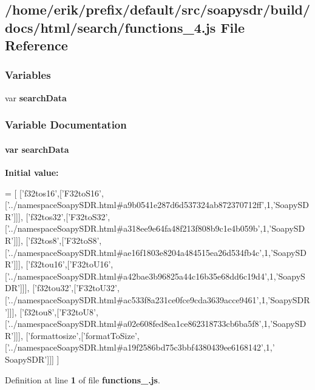 \subsection{/home/erik/prefix/default/src/soapysdr/build/docs/html/search/functions\+\_\+4.js File Reference}
\label{functions__4_8js}
\subsubsection*{Variables}
\begin{DoxyCompactItemize}
\item 
var {\bf search\+Data}
\end{DoxyCompactItemize}


\subsubsection{Variable Documentation}
\paragraph[{search\+Data}]{\setlength{\rightskip}{0pt plus 5cm}var search\+Data}\label{functions__4_8js_ad01a7523f103d6242ef9b0451861231e}
{\bfseries Initial value\+:}
\begin{DoxyCode}
=
[
  [\textcolor{stringliteral}{'f32tos16'},[\textcolor{stringliteral}{'F32toS16'},[\textcolor{stringliteral}{'../namespaceSoapySDR.html#a9b0541e287d6d537324ab872370712ff'},1,\textcolor{stringliteral}{'SoapySDR'}]]],
  [\textcolor{stringliteral}{'f32tos32'},[\textcolor{stringliteral}{'F32toS32'},[\textcolor{stringliteral}{'../namespaceSoapySDR.html#a318ee9e64fa48f213f808b9c1e4b059b'},1,\textcolor{stringliteral}{'SoapySDR'}]]],
  [\textcolor{stringliteral}{'f32tos8'},[\textcolor{stringliteral}{'F32toS8'},[\textcolor{stringliteral}{'../namespaceSoapySDR.html#ae16f1803e8204a484515ea26d534fb4c'},1,\textcolor{stringliteral}{'SoapySDR'}]]],
  [\textcolor{stringliteral}{'f32tou16'},[\textcolor{stringliteral}{'F32toU16'},[\textcolor{stringliteral}{'../namespaceSoapySDR.html#a42bae3b96825a44c16b35e68dd6c19d4'},1,\textcolor{stringliteral}{'SoapySDR'}]]],
  [\textcolor{stringliteral}{'f32tou32'},[\textcolor{stringliteral}{'F32toU32'},[\textcolor{stringliteral}{'../namespaceSoapySDR.html#ac533f8a231ce0fce9cda3639acce9461'},1,\textcolor{stringliteral}{'SoapySDR'}]]],
  [\textcolor{stringliteral}{'f32tou8'},[\textcolor{stringliteral}{'F32toU8'},[\textcolor{stringliteral}{'../namespaceSoapySDR.html#a02e608fed8ea1ce862318733cb6ba5f8'},1,\textcolor{stringliteral}{'SoapySDR'}]]],
  [\textcolor{stringliteral}{'formattosize'},[\textcolor{stringliteral}{'formatToSize'},[\textcolor{stringliteral}{'../namespaceSoapySDR.html#a19f2586bd75c3bbf4380439ee6168142'},1,\textcolor{stringliteral}{'
      SoapySDR'}]]]
]
\end{DoxyCode}


Definition at line {\bf 1} of file {\bf functions\+\_.\+js}.

